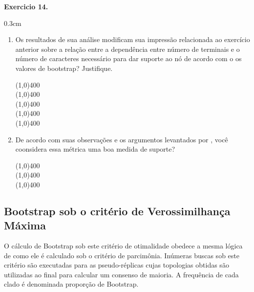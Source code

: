 \begin{refsection}
\begin{blackBlock}{\textbf{Exercicio 14.}}
\end{blackBlock}


\begin {myindentpar}{0.3cm}
\begin{enumerate}[\itshape i.]

	\item{Os resultados de sua análise modificam sua impressão relacionada ao exercício anterior sobre a relação entre a dependência entre número de terminais e o número de caracteres necessário para dar suporte ao nó de acordo com o os valores de bootstrap? Justifique.}


\begin{center}
\line(1,0){400}\\
\line(1,0){400}\\
\line(1,0){400}\\
\line(1,0){400}\\
\line(1,0){400}\\
\end{center}


	\item{De acordo com suas observações e os argumentos levantados por \textcite{GrantKluge2008b}, você coonsidera essa métrica uma boa medida de suporte?}

\begin{center}
\line(1,0){400}\\
\line(1,0){400}\\
\line(1,0){400}\\
\end{center}

\end{enumerate}
\end{myindentpar}

\subsection{Bootstrap sob o critério de Verossimilhança Máxima}\label{tut14:boots:likelihood}

O cálculo de Bootstrap sob este critério de otimalidade obedece a mesma lógica de como ele é calculado sob o critério de parcimônia. Inúmeras buscas sob este critério são executadas para as pseudo-réplicas cujas topologias obtidas são utilizadas ao final para calcular um consenso de maioria. A frequência de cada clado é denominada proporção de Bootstrap. 


\end{refsection}
